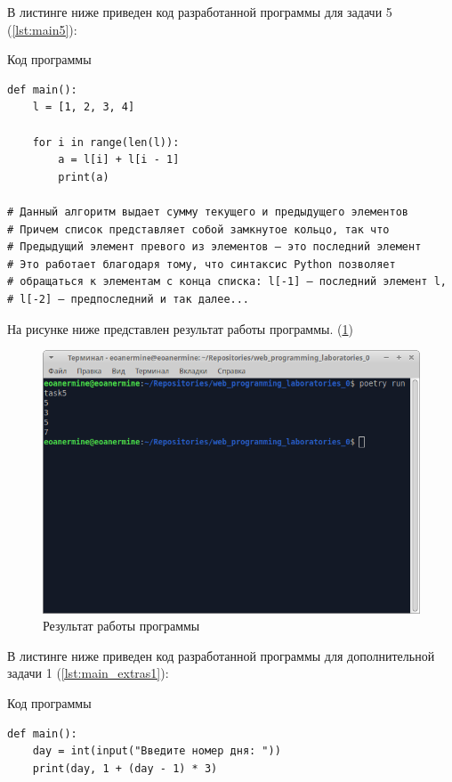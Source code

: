 \documentclass[14pt]{extarticle}
\newenvironment{code}{\captionsetup{type=listing, belowskip=-14pt plus 3pt minus 0pt}}{}
\begin{document}
В листинге ниже приведен код разработанной программы для задачи 5 (\ref{lst:main5}):

\begin{code}    
\caption{Код программы\label{lst:main5}}
\begin{verbatim}
def main():
	l = [1, 2, 3, 4]

	for i in range(len(l)):
		a = l[i] + l[i - 1]
		print(a)

# Данный алгоритм выдает сумму текущего и предыдущего элементов
# Причем список представляет собой замкнутое кольцо, так что
# Предыдущий элемент превого из элементов — это последний элемент
# Это работает благодаря тому, что синтаксис Python позволяет
# обращаться к элементам с конца списка: l[-1] — последний элемент l,
# l[-2] — предпоследний и так далее...
\end{verbatim}
\end{code}

На рисунке ниже представлен результат работы программы. (\ref{img:main5})

\begin{figure}[H]
    \centering
    \includegraphics[width=1.0\linewidth]{main5.png}
    \caption{Результат работы программы\label{img:main5}}
\end{figure}

В листинге ниже приведен код разработанной программы для дополнительной задачи 1 (\ref{lst:main_extras1}):

\begin{code}    
\caption{Код программы\label{lst:main_extras1}}
\begin{verbatim}
def main():
	day = int(input("Введите номер дня: "))
	print(day, 1 + (day - 1) * 3)
\end{verbatim}
\end{code}
\end{document}
